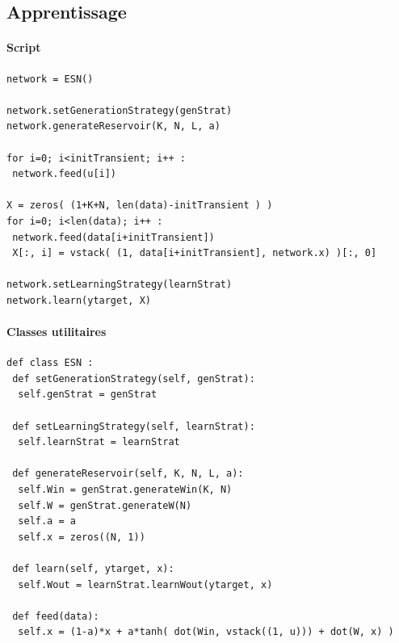 \documentclass[12pt]{article}
\begin{document}
\subsection{Apprentissage}
\paragraph{Script}
\begin{verbatim}
network = ESN()

network.setGenerationStrategy(genStrat)
network.generateReservoir(K, N, L, a)

for i=0; i<initTransient; i++ :
 network.feed(u[i])

X = zeros( (1+K+N, len(data)-initTransient ) )
for i=0; i<len(data); i++ :
 network.feed(data[i+initTransient])
 X[:, i] = vstack( (1, data[i+initTransient], network.x) )[:, 0] 

network.setLearningStrategy(learnStrat)
network.learn(ytarget, X)
\end{verbatim}

\paragraph{Classes utilitaires}
\begin{verbatim}
def class ESN :
 def setGenerationStrategy(self, genStrat):
  self.genStrat = genStrat

 def setLearningStrategy(self, learnStrat):
  self.learnStrat = learnStrat

 def generateReservoir(self, K, N, L, a):
  self.Win = genStrat.generateWin(K, N)
  self.W = genStrat.generateW(N)
  self.a = a
  self.x = zeros((N, 1))

 def learn(self, ytarget, x):
  self.Wout = learnStrat.learnWout(ytarget, x)
  
 def feed(data):
  self.x = (1-a)*x + a*tanh( dot(Win, vstack((1, u))) + dot(W, x) )
\end{verbatim}
\end{document}
